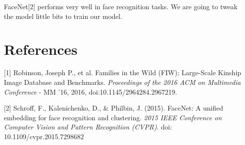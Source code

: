 \documentclass{article}
\begin{document}
FaceNet[2] performs very well in face recognition tasks. We are going to tweak the
model little bits to train our model.

\section*{References}
\medskip
\small
[1] Robinson, Joseph P., et al. Families in the Wild (FIW): Large-Scale Kinship
Image Database and Benchmarks. {\it Proceedings of the 2016 ACM on Multimedia
Conference} - MM '16, 2016, doi:10.1145/2964284.2967219.

[2] Schroff, F., Kalenichenko, D., \& Philbin, J. (2015). FaceNet: A unified
embedding for face recognition and clustering. {\it 2015 IEEE Conference on
Computer Vision and Pattern Recognition (CVPR)}. doi: 10.1109/cvpr.2015.7298682
\end{document}
